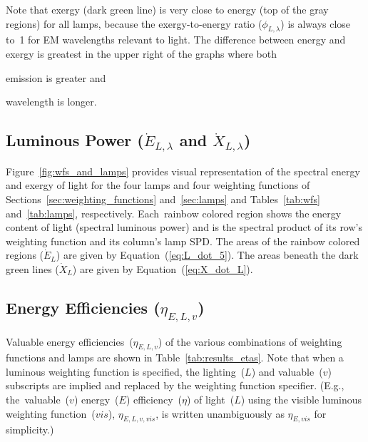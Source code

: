 \documentclass[energies,article,accept,moreauthors,pdftex]{Definitions/mdpi}\usepackage[]{graphicx}\usepackage[]{color}
\begin{document}
Note that exergy (dark green line) is very close to energy (top of the gray regions)
for all lamps, because
the exergy-to-energy ratio ($\phi_{L,\lambda}$) is always close to~1 for EM wavelengths relevant to light.
The difference between energy and exergy is greatest in the upper right of the graphs where both
%
\begin{enumerate*}[label={(\alph*)}]

  \item emission is greater and

  \item wavelength is longer.

\end{enumerate*}


\subsection{Luminous Power ($\dot{E}_{L,\lambda}$ and $\dot{X}_{L,\lambda}$)}
\label{sec:results_luminous_power}

Figure~\ref{fig:wfs_and_lamps} provides visual representation of the spectral energy and exergy of light
for the four lamps and four weighting functions of 
Sections~\ref{sec:weighting_functions} and~\ref{sec:lamps}
and Tables~\ref{tab:wfs} and~\ref{tab:lamps}, respectively.
\mbox{Each rainbow} colored region shows the energy content of light (spectral luminous power) and
is the spectral product of its row's weighting function and its column's lamp SPD.
The areas of the rainbow colored regions ($\dot{E}_L$) are given by Equation~(\ref{eq:L_dot_5}).
The areas beneath the dark green lines ($\dot{X}_L$) are given by 
Equation~(\ref{eq:X_dot_L}).


\subsection{Energy Efficiencies ($\eta_{E,L,v}$)}
\label{sec:results_energy_efficiencies}

Valuable energy efficiencies~($\eta_{E,L,v}$) of the various combinations of weighting functions and lamps
are shown in Table~\ref{tab:results_etas}.
Note that when a luminous weighting function is specified,
the lighting~($L$) and valuable~($v$) subscripts are implied and replaced by the weighting function specifier.
(E.g., \mbox{the valuable~($v$)} energy~($E$) efficiency~($\eta$) of light~($L$) 
using the visible luminous weighting function~($vis$),
$\eta_{E,L,v,vis}$, is written unambiguously as $\eta_{E,vis}$
for simplicity.)
\end{document}
